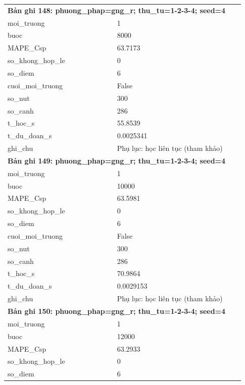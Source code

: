 \begin{longtable}{p{0.43\linewidth}p{0.50\linewidth}}
\midrule
\multicolumn{2}{p{0.95\linewidth}}{\textbf{Bản ghi 148: phuong\_phap=gng\_r; thu\_tu=1-2-3-4; seed=4}} \\
moi\_\allowbreak truong & 1 \\
buoc & 8000 \\
MAPE\_\allowbreak Csp & 63.7173 \\
so\_\allowbreak khong\_\allowbreak hop\_\allowbreak le & 0 \\
so\_\allowbreak diem & 6 \\
cuoi\_\allowbreak moi\_\allowbreak truong & False \\
so\_\allowbreak nut & 300 \\
so\_\allowbreak canh & 286 \\
t\_\allowbreak hoc\_\allowbreak s & 55.8539 \\
t\_\allowbreak du\_\allowbreak doan\_\allowbreak s & 0.0025341 \\
ghi\_\allowbreak chu & Phụ lục: học liên tục (tham khảo) \\
\midrule
\multicolumn{2}{p{0.95\linewidth}}{\textbf{Bản ghi 149: phuong\_phap=gng\_r; thu\_tu=1-2-3-4; seed=4}} \\
moi\_\allowbreak truong & 1 \\
buoc & 10000 \\
MAPE\_\allowbreak Csp & 63.5981 \\
so\_\allowbreak khong\_\allowbreak hop\_\allowbreak le & 0 \\
so\_\allowbreak diem & 6 \\
cuoi\_\allowbreak moi\_\allowbreak truong & False \\
so\_\allowbreak nut & 300 \\
so\_\allowbreak canh & 286 \\
t\_\allowbreak hoc\_\allowbreak s & 70.9864 \\
t\_\allowbreak du\_\allowbreak doan\_\allowbreak s & 0.0029153 \\
ghi\_\allowbreak chu & Phụ lục: học liên tục (tham khảo) \\
\midrule
\multicolumn{2}{p{0.95\linewidth}}{\textbf{Bản ghi 150: phuong\_phap=gng\_r; thu\_tu=1-2-3-4; seed=4}} \\
moi\_\allowbreak truong & 1 \\
buoc & 12000 \\
MAPE\_\allowbreak Csp & 63.2933 \\
so\_\allowbreak khong\_\allowbreak hop\_\allowbreak le & 0 \\
so\_\allowbreak diem & 6 \\

\end{longtable}
